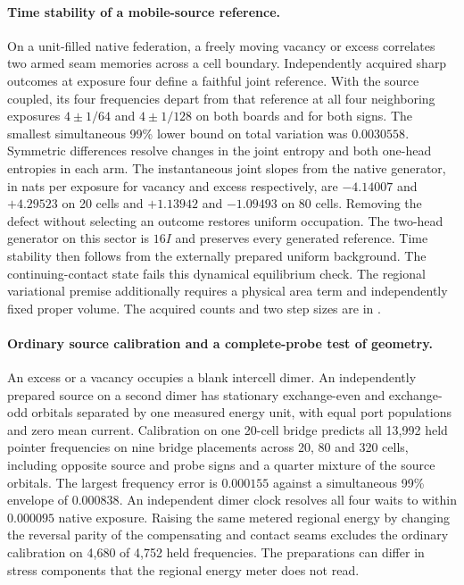 \documentclass[11pt]{article}
\begin{document}
\paragraph{Time stability of a mobile-source reference.}
On a unit-filled native federation, a freely moving vacancy or excess
correlates two armed seam memories across a cell boundary. Independently
acquired sharp outcomes at exposure four define a faithful joint reference.
With the source coupled, its four frequencies depart from that
reference at all four neighboring exposures $4\pm1/64$ and $4\pm1/128$
on both boards and for both signs. The smallest simultaneous 99\%
lower bound on total variation was $0.0030558$. Symmetric differences
resolve changes in the joint entropy and both one-head entropies in
each arm. The instantaneous joint slopes from the native generator, in
nats per exposure for vacancy and excess respectively, are $-4.14007$
and $+4.29523$ on 20 cells and $+1.13942$ and $-1.09493$ on 80 cells.
Removing the defect without selecting an outcome restores uniform
occupation. The two-head generator on this sector is $16I$ and
preserves every generated reference. Time stability then follows
from the externally prepared uniform background. The continuing-contact
state fails this dynamical equilibrium check. The regional variational
premise additionally requires a physical area term and independently
fixed proper volume. The acquired counts and two step sizes are in
.

\paragraph{Ordinary source calibration and a complete-probe test of geometry.}
An excess or a vacancy occupies a blank intercell dimer. An independently
prepared source on a second dimer has stationary exchange-even and
exchange-odd orbitals separated by one measured energy unit, with equal
port populations and zero mean current. Calibration on one 20-cell bridge
predicts all 13,992 held pointer frequencies on nine bridge placements
across 20, 80 and 320 cells, including opposite source and probe signs and
a quarter mixture of the source orbitals. The largest frequency error is
$0.000155$ against a simultaneous 99\% envelope of $0.000838$.
An independent dimer clock resolves all four waits to within $0.000095$
native exposure. Raising the same metered regional energy by changing
the reversal parity of the compensating and contact seams excludes the
ordinary calibration on 4,680 of 4,752 held frequencies. The preparations
can differ in stress components that the regional energy meter does not read.
\end{document}

